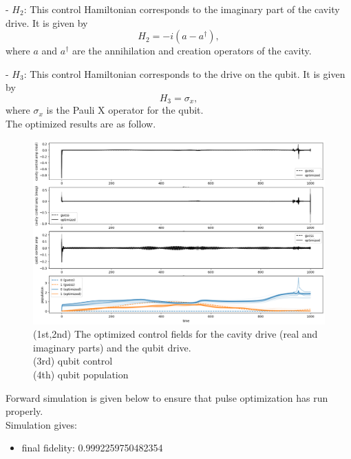 \documentclass[12pt]{article}
\begin{document}
   - $H_2$: This control Hamiltonian corresponds to the imaginary part of the cavity drive. It is given by
     \begin{equation}
     H_2 = -i\left(a - a^\dagger\right),
     \end{equation}
     where $a$ and $a^\dagger$ are the annihilation and creation operators of the cavity.

   - $H_3$: This control Hamiltonian corresponds to the drive on the qubit. It is given by
     \begin{equation}
     H_3 = \sigma_x,
     \end{equation}
     where $\sigma_x$ is the Pauli X operator for the qubit.
\\
The optimized results are as follow. 
\begin{figure}[H]
    \centering
    \includegraphics[width=0.95\linewidth]{vac2cat_krotov.png}
    \caption{
        (1st,2nd) The optimized control fields for the cavity drive (real and imaginary parts) and the qubit drive. \\
        (3rd) qubit control \\
        (4th) qubit population
    }
    \label{fig:vac2cat_krotov}
\end{figure}

Forward simulation is given below to ensure that pulse optimization has run properly. 
\\
Simulation gives: 
\begin{itemize}
    \item final fidelity:  0.9992259750482354
\end{itemize}
\end{document}
